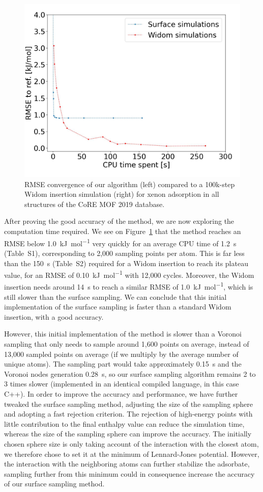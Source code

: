 \documentclass[main]{subfiles}
\begin{document}
\begin{figure}[ht]
\centering
  \includegraphics[width=0.7\linewidth]{figures/3-fastsim/time_rmse.jpeg}
  \caption{RMSE convergence of our algorithm (left) compared to a 100k-step Widom insertion simulation (right) for xenon adsorption in {all} structures of the CoRE MOF 2019 database.}\label{fgr:convergence}
\end{figure}

After proving the good accuracy of the method, we are now exploring the computation time required. We see on Figure~\ref{fgr:convergence} that the method reaches an RMSE below \SI{1.0}{\kilo\joule\per\mole} very quickly for an average CPU time of \SI{1.2}{\second} (Table~S1), corresponding to 2,000 sampling points per atom. This is far less than the \SI{150}{\second} (Table~S2) required for a Widom insertion to reach its plateau value, for an RMSE of \SI{0.10}{\kilo\joule\per\mole} with 12,000 cycles. Moreover, the Widom insertion needs around \SI{14}{\second} to reach a similar RMSE of \SI{1.0}{\kilo\joule\per\mole}, which is still slower than the surface sampling. We can conclude that this initial implementation of the surface sampling is faster than a standard Widom insertion, with a good accuracy.

However, this initial implementation of the method is slower than a Voronoi sampling that only needs to sample around 1,600 points on average, instead of 13,000 sampled points on average (if we multiply by the average number of unique atoms). The sampling part would take approximately \SI{0.15}{\second} and the Voronoi nodes generation \SI{0.28}{\second}, so our surface sampling algorithm remains 2 to 3 times slower (implemented in an identical compiled language, in this case C++). In order to improve the accuracy and performance, we have further tweaked the surface sampling method, adjusting the size of the sampling sphere and adopting a fast rejection criterion. The rejection of high-energy points with little contribution to the final enthalpy value can reduce the simulation time, whereas the size of the sampling sphere can improve the accuracy. The initially chosen sphere size is only taking account of the interaction with the closest atom, we therefore chose to set it at the minimum of Lennard-Jones potential. However, the interaction with the neighboring atoms can further stabilize the adsorbate, sampling further from this minimum could in consequence increase the accuracy of our surface sampling method.
\end{document}
